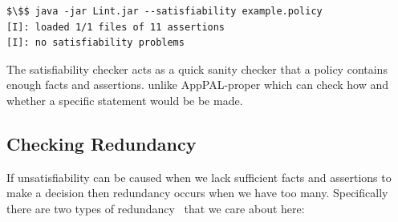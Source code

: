 \documentclass[thesis.tex]{subfiles}
\begin{document}
\begin{lstlisting}
$\$$ java -jar Lint.jar --satisfiability example.policy
[I]: loaded 1/1 files of 11 assertions
[I]: no satisfiability problems
\end{lstlisting}

The satisfiability checker acts as a quick sanity checker that a policy contains
enough facts and assertions. unlike AppPAL-proper which can check how and whether a specific statement would be be made.

%

\subsection{Checking Redundancy}

If unsatisfiability can be caused when we lack sufficient facts and assertions to make a decision then redundancy occurs when we have too many.  Specifically there are two types of redundancy~\cite{alon_levy_constraints_1992} that we care about here:
\end{document}
